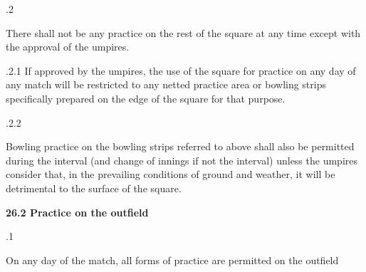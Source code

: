 \documentclass[12pt]{article}
\begin{document}
\vspace{\baselineskip}
{\fontsize{9pt}{10.8pt}.2 \tabto{0.49in} {\fontsize{8pt}{9.6pt}\selectfont There shall not be any practice on the rest of the square at any time except with the approval of the umpires.\par}\par}\par


\vspace{\baselineskip}
\begin{adjustwidth}{1.18in}{0.14in}
\begin{justify}
{\fontsize{9pt}{10.8pt}.2.1 \tabto{1.17in} If approved by the umpires, the use of the square for practice on any day of any match will be restricted to any netted practice area or bowling strips specifically prepared on the edge of the square for that purpose.\par}
\end{justify}\par

\end{adjustwidth}


\vspace{\baselineskip}
\begin{adjustwidth}{1.18in}{0.15in}
{\fontsize{9pt}{10.8pt}.2.2 \tabto{1.17in} {\fontsize{8pt}{9.6pt}\selectfont Bowling practice on the bowling strips referred to above shall also be permitted during the interval (and change of innings if not the interval) unless the umpires consider that, in the prevailing conditions of ground and weather, it will be detrimental to the surface of the square.\par}\par}\par

\end{adjustwidth}


\vspace{\baselineskip}
{\fontsize{11pt}{13.2pt}\selectfont \textbf{26.2 \tabto{0.47in} Practice on the outfield}\par}\par


\vspace{\baselineskip}
{\fontsize{9pt}{10.8pt}.1 \tabto{0.49in} {\fontsize{8pt}{9.6pt}\selectfont On any day of the match, all forms of practice are permitted on the outfield\par}\par}\par
\end{document}
